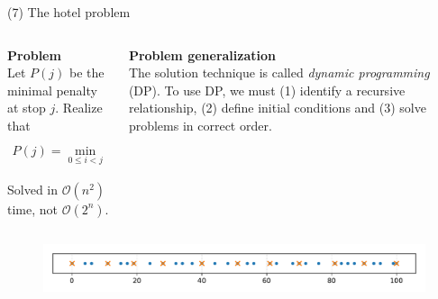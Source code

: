 \documentclass[11pt, aspectratio=149]{beamer}
\theoremstyle{plain}
\begin{document}
\begin{frame}[fragile, t]{(7) The hotel problem}
	\begin{columns}
		\begin{column}{0.5\textwidth}
			\textbf{Problem} \\ 
			Let $P(j)$ be the minimal penalty at stop $j$.
			Realize that
			\begin{align*}
			P(j) = \min_{ 0 \leq i < j}
			\left( P(i) + (M - (h_j - h_i))^2 \right).
			\end{align*}
			
			Solved in $\mathcal{O}(n^2)$ time, not $\mathcal{O}(2^n)$.
			
		\end{column}
		\begin{column}{0.5\textwidth}%
			\textbf{Problem generalization} \\ \vspace*{0.5em} 
			The solution technique is called \emph{dynamic programming} (DP).
			To use DP, we must (1) identify a recursive relationship, (2) define initial conditions and (3) solve problems in correct order.
		\end{column}
	\end{columns}
	
		\begin{figure}
			\centering
			\includegraphics[width=1\linewidth]{figs/hotel_problem_instance_large_solution.pdf}
		\end{figure}
\end{frame}


\end{document}
